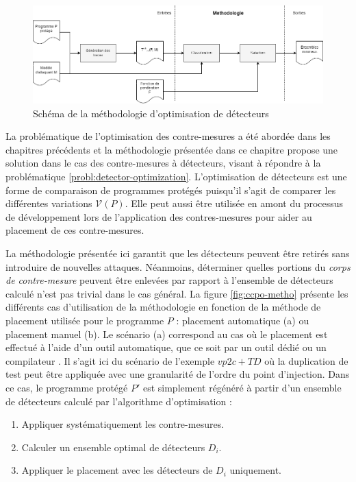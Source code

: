             \begin{figure}[!ht]\centering
                \includegraphics[scale=0.4]{ch6-ccpo/img/ccpo-scheme-select.drawio.png}
                \caption{Schéma de la méthodologie d'optimisation de détecteurs}
                \label{fig:ccpo-scheme}
            \end{figure}
    
            La problématique de l'optimisation des contre-mesures a été abordée dans les chapitres précédents et la méthodologie présentée dans ce chapitre propose une solution dans le cas des contre-mesures à détecteurs, visant à répondre à la problématique \ref{probl:detector-optimization}.
            L'optimisation de détecteurs est une forme de comparaison de programmes protégés puisqu'il s'agit de comparer les différentes variations $\mathcal{V}(P)$.            
            Elle peut aussi être utilisée en amont du processus de développement lors de l'application des contres-mesures pour aider au placement de ces contre-mesures.        
    
            La méthodologie présentée ici garantit que les détecteurs peuvent être retirés sans introduire de nouvelles attaques. Néanmoins, déterminer quelles portions du \textit{corps de contre-mesure} peuvent être enlevées par rapport à l'ensemble de détecteurs calculé n'est pas trivial dans le cas général.
            La figure \ref{fig:ccpo-metho} présente les différents cas d'utilisation de la méthodologie en fonction de la méthode de placement utilisée pour le programme $P$ : placement automatique (a) ou placement manuel (b).
            Le scénario (a) correspond au cas où le placement est effectué à l'aide d'un outil automatique, que ce soit par un outil dédié \cite{lalande} ou un compilateur \cite{Reis/ISCCO05, Proy/TACO17}.
            Il s'agit ici du scénario de l'exemple $vp2c+TD$ où la duplication de test peut être appliquée avec une granularité de l'ordre du point d'injection. 
            Dans ce cas, le programme protégé $P'$ est simplement régénéré à partir d'un ensemble de détecteurs calculé par l'algorithme d'optimisation : 
            \begin{enumerate}
                \item Appliquer systématiquement les contre-mesures.
                \item Calculer un ensemble optimal de détecteurs $D_i$.
                \item Appliquer le placement avec les détecteurs de $D_i$ uniquement.
            \end{enumerate}
    
